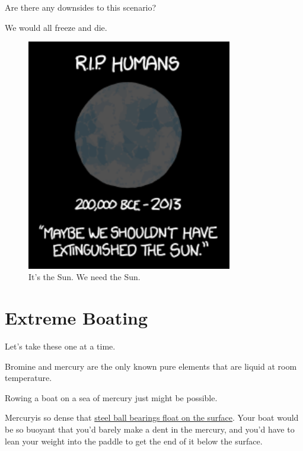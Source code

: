 {{Are there any downsides to this scenario?}

{We would all freeze and die.}

\begin{figure}[!htbp]
\centering
\includegraphics[scale=0.5, max width=0.8\textwidth]{imgs/a/49/sunless_freeze.png}
\caption{It's the Sun. We need the Sun.}
\end{figure}

{
\chapter{Extreme Boating}
}

\hfill{}

{Let's take these one at a time.}

{Bromine and mercury are the only known pure elements that are liquid at room temperature.}

{Rowing a boat on a sea of mercury just might be possible.}

{Mercuryis so dense that \href{http://www.youtube.com/watch?v=EGv\_YVQHu7U}{steel ball bearings float on the surface}. Your boat would be so buoyant that you'd barely make a dent in the mercury, and you'd have to lean your weight into the paddle to get the end of it below the surface.}

}
